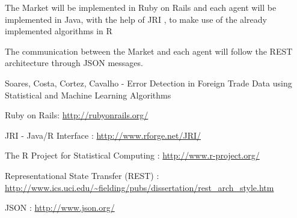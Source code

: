 \documentclass{llncs}
\begin{document}
The Market will be implemented in Ruby on Rails \cite{tec:RoR} and each agent will be implemented in Java, with the help of JRI \cite{tec:JRI}, to make use of the already implemented algorithms in R \cite{tec:R}

The communication between the Market and each agent will follow the REST architecture \cite{tec:REST} through JSON \cite{tec:JSON} messages.

\begin{thebibliography}{9}
Soares, Costa, Cortez, Cavalho - Error Detection in Foreign Trade Data   using Statistical and Machine Learning Algorithms

Ruby on Rails:
\url{http://rubyonrails.org/}

JRI - Java/R Interface : 
\url{http://www.rforge.net/JRI/}

The R Project for Statistical Computing :
\url{http://www.r-project.org/}

Representational State Transfer (REST) :
\url{http://www.ics.uci.edu/~fielding/pubs/dissertation/rest_arch_style.htm}

JSON :
\url{http://www.json.org/}



\end{thebibliography}
\end{document}
